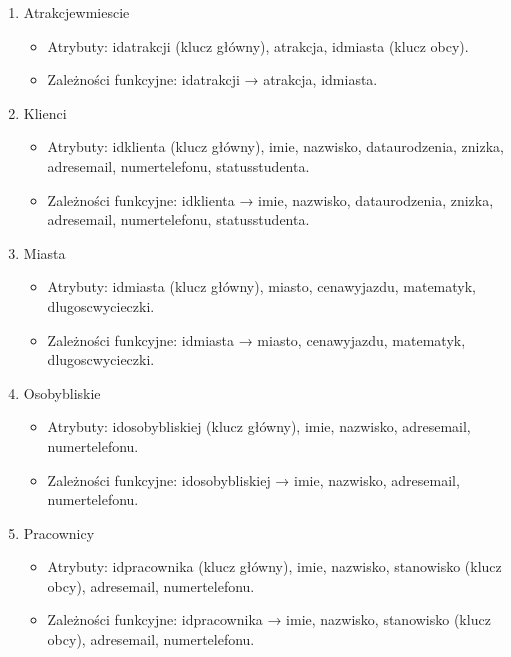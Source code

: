 \documentclass{article}
\begin{document}
	\begin{enumerate}
		
		\item Atrakcje\textunderscore w\textunderscore miescie
		\begin{itemize}
			\item Atrybuty: id\textunderscore atrakcji (klucz główny), atrakcja, id\textunderscore miasta (klucz obcy).
			\item Zależności funkcyjne: id\textunderscore atrakcji → atrakcja, id\textunderscore miasta.
		\end{itemize}
		
		\item Klienci
		\begin{itemize}
			\item Atrybuty: id\textunderscore klienta (klucz główny), imie, nazwisko, data\textunderscore urodzenia, znizka, adres\textunderscore email, numer\textunderscore telefonu, status\textunderscore studenta.
			\item Zależności funkcyjne: id\textunderscore klienta → imie, nazwisko, data\textunderscore urodzenia, znizka, adres\textunderscore email, numer\textunderscore telefonu, status\textunderscore studenta.
		\end{itemize}
		
		\item Miasta
		\begin{itemize}
			\item Atrybuty: id\textunderscore miasta (klucz główny), miasto, cena\textunderscore wyjazdu, matematyk, dlugosc\textunderscore wycieczki.
			\item Zależności funkcyjne: id\textunderscore miasta → miasto, cena\textunderscore wyjazdu, matematyk, dlugosc\textunderscore wycieczki.
		\end{itemize}
		
		\item Osoby\textunderscore bliskie
		\begin{itemize}
			\item Atrybuty: id\textunderscore osoby\textunderscore bliskiej (klucz główny), imie, nazwisko, adres\textunderscore email, numer\textunderscore telefonu.
			\item Zależności funkcyjne: id\textunderscore osoby\textunderscore bliskiej → imie, nazwisko, adres\textunderscore email, numer\textunderscore telefonu.
		\end{itemize}
		
		\item Pracownicy
		\begin{itemize}
			\item Atrybuty: id\textunderscore pracownika (klucz główny), imie, nazwisko, stanowisko (klucz obcy), adres\textunderscore email, numer\textunderscore telefonu.
			\item Zależności funkcyjne: id\textunderscore pracownika → imie, nazwisko, stanowisko (klucz obcy), adres\textunderscore email, numer\textunderscore telefonu.
		\end{itemize}
		

\end{enumerate}
\end{document}
